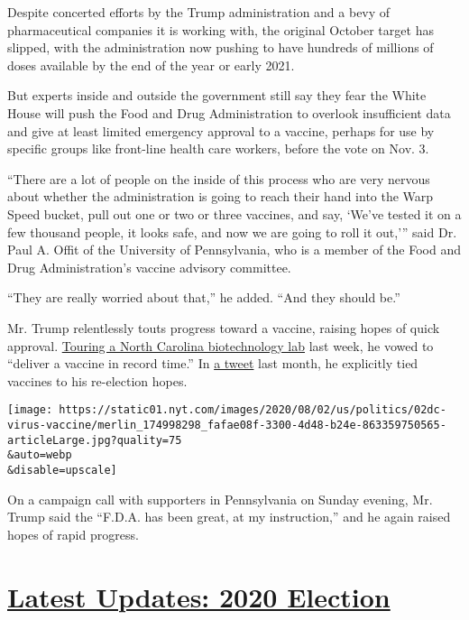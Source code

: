 Despite concerted efforts by the Trump administration and a bevy of
pharmaceutical companies it is working with, the original October target
has slipped, with the administration now pushing to have hundreds of
millions of doses available by the end of the year or early 2021.

But experts inside and outside the government still say they fear the
White House will push the Food and Drug Administration to overlook
insufficient data and give at least limited emergency approval to a
vaccine, perhaps for use by specific groups like front-line health care
workers, before the vote on Nov. 3.

``There are a lot of people on the inside of this process who are very
nervous about whether the administration is going to reach their hand
into the Warp Speed bucket, pull out one or two or three vaccines, and
say, `We've tested it on a few thousand people, it looks safe, and now
we are going to roll it out,''' said Dr. Paul A. Offit of the University
of Pennsylvania, who is a member of the Food and Drug Administration's
vaccine advisory committee.

``They are really worried about that,'' he added. ``And they should
be.''

Mr. Trump relentlessly touts progress toward a vaccine, raising hopes of
quick approval.
\href{https://www.nytimes.com/video/us/100000007258794/trump-boasts-vaccine-progress-north-carolina.html}{Touring
a North Carolina biotechnology lab} last week, he vowed to ``deliver a
vaccine in record time.'' In
\href{https://twitter.com/realdonaldtrump/status/1283566319405797378}{a
tweet} last month, he explicitly tied vaccines to his re-election hopes.

\texttt{[image: https://static01.nyt.com/images/2020/08/02/us/politics/02dc-virus-vaccine/merlin\_174998298\_fafae08f-3300-4d48-b24e-863359750565-articleLarge.jpg?quality=75\\\&auto=webp\\\&disable=upscale]}

On a campaign call with supporters in Pennsylvania on Sunday evening,
Mr. Trump said the ``F.D.A. has been great, at my instruction,'' and he
again raised hopes of rapid progress.

\hypertarget{latest-updates-2020-election}{%
\section{\texorpdfstring{\href{https://www.nytimes.com/2020/08/04/us/elections/primary-election-michigan-arizona-kansas.html?action=click\&pgtype=Article\&state=default\&region=MAIN_CONTENT_1\&context=storylines_live_updates}{Latest
Updates: 2020
Election}}{Latest Updates: 2020 Election}}\label{latest-updates-2020-election}}

